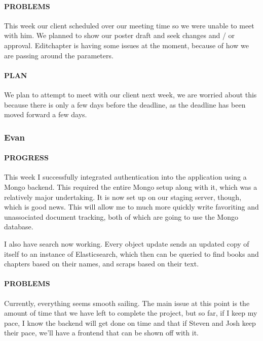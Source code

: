 \documentclass[onecolumn, draftclsnofoot,10pt, compsoc]{IEEEtran}
\begin{document}
	\paragraph{PROBLEMS}
	This week our client scheduled over our meeting time so we were unable to meet with him. We planned to show our poster draft and seek changes and / or approval. Editchapter is having some issues at the moment, because of how we are passing around the parameters.
	
	\paragraph{PLAN}
	We plan to attempt to meet with our client next week, we are worried about this because there is only a few days before the deadline, as the deadline has been moved forward a few days.
	
	\subsubsection{Evan}
	
	\paragraph{PROGRESS}
	
	This week I successfully integrated authentication into the application using a Mongo backend. This required the entire Mongo setup along with it, which was a relatively major undertaking. It is now set up on our staging server, though, which is good news. This will allow me to much more quickly write favoriting and unassociated document tracking, both of which are going to use the Mongo database.
	
	I also have search now working. Every object update sends an updated copy of itself to an instance of Elasticsearch, which then can be queried to find books and chapters based on their names, and scraps based on their text.
	
	\paragraph{PROBLEMS}
	
	Currently, everything seems smooth sailing. The main issue at this point is the amount of time that we have left to complete the project, but so far, if I keep my pace, I know the backend will get done on time and that if Steven and Josh keep their pace, we'll have a frontend that can be shown off with it. 
	
\end{document}

